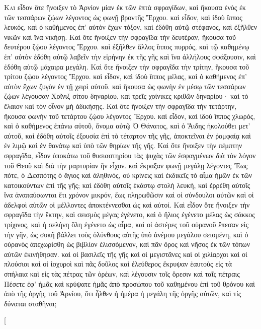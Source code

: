 \begin{pages}
    \begin{Rightside}
        \beginnumbering
		\renewcommand{\LettrineFontHook}{\PHtitl}
		\lettrine[lines=3]{Κ}{αὶ} εἶδον ὅτε ἤνοιξεν τὸ Ἀρνίον μίαν ἐκ τῶν ἑπτὰ σφραγίδων, καὶ ἤκουσα ἑνὸς ἐκ τῶν τεσσάρων ζῴων λέγοντος ὡς φωνῇ βροντῆς Ἔρχου. καὶ εἶδον, καὶ ἰδοὺ ἵππος λευκός, καὶ ὁ καθήμενος ἐπ’ αὐτὸν ἔχων τόξον, καὶ ἐδόθη αὐτῷ στέφανος, καὶ ἐξῆλθεν νικῶν καὶ ἵνα νικήσῃ.
		\pend
		\pstart
		Καὶ ὅτε ἤνοιξεν τὴν σφραγῖδα τὴν δευτέραν, ἤκουσα τοῦ δευτέρου ζῴου λέγοντος Ἔρχου. καὶ ἐξῆλθεν ἄλλος ἵππος πυρρός, καὶ τῷ καθημένῳ ἐπ’ αὐτὸν ἐδόθη αὐτῷ λαβεῖν τὴν εἰρήνην ἐκ τῆς γῆς καὶ ἵνα ἀλλήλους σφάξουσιν, καὶ ἐδόθη αὐτῷ μάχαιρα μεγάλη.
		\pend
		\pstart
		Καὶ ὅτε ἤνοιξεν τὴν σφραγῖδα τὴν τρίτην, ἤκουσα τοῦ τρίτου ζῴου λέγοντος Ἔρχου. καὶ εἶδον, καὶ ἰδοὺ ἵππος μέλας, καὶ ὁ καθήμενος ἐπ’ αὐτὸν ἔχων ζυγὸν ἐν τῇ χειρὶ αὐτοῦ. καὶ ἤκουσα ὡς φωνὴν ἐν μέσῳ τῶν τεσσάρων ζῴων λέγουσαν Χοῖνιξ σίτου δηναρίου, καὶ τρεῖς χοίνικες κριθῶν δηναρίου· καὶ τὸ ἔλαιον καὶ τὸν οἶνον μὴ ἀδικήσῃς. 
		\pend
		\pstart
		Καὶ ὅτε ἤνοιξεν τὴν σφραγῖδα τὴν τετάρτην, ἤκουσα φωνὴν τοῦ τετάρτου ζῴου λέγοντος Ἔρχου. καὶ εἶδον, καὶ ἰδοὺ ἵππος χλωρός, καὶ ὁ καθήμενος ἐπάνω αὐτοῦ, ὄνομα αὐτῷ Ὁ Θάνατος, καὶ ὁ Ἅιδης ἠκολούθει μετ’ αὐτοῦ, καὶ ἐδόθη αὐτοῖς ἐξουσία ἐπὶ τὸ τέταρτον τῆς γῆς, ἀποκτεῖναι ἐν ῥομφαίᾳ καὶ ἐν λιμῷ καὶ ἐν θανάτῳ καὶ ὑπὸ τῶν θηρίων τῆς γῆς.
		\pend
		\pstart
		Καὶ ὅτε ἤνοιξεν τὴν πέμπτην σφραγῖδα, εἶδον ὑποκάτω τοῦ θυσιαστηρίου τὰς ψυχὰς τῶν ἐσφαγμένων διὰ τὸν λόγον τοῦ Θεοῦ καὶ διὰ τὴν μαρτυρίαν ἣν εἶχον. καὶ ἔκραξαν φωνῇ μεγάλῃ λέγοντες Ἕως πότε, ὁ Δεσπότης ὁ ἅγιος καὶ ἀληθινός, οὐ κρίνεις καὶ ἐκδικεῖς τὸ αἷμα ἡμῶν ἐκ τῶν κατοικούντων ἐπὶ τῆς γῆς; καὶ ἐδόθη αὐτοῖς ἑκάστῳ στολὴ λευκή, καὶ ἐρρέθη αὐτοῖς ἵνα ἀναπαύσωνται ἔτι χρόνον μικρόν, ἕως πληρωθῶσιν καὶ οἱ σύνδουλοι αὐτῶν καὶ οἱ ἀδελφοὶ αὐτῶν οἱ μέλλοντες ἀποκτέννεσθαι ὡς καὶ αὐτοί.
		\pend
		\pstart
		Καὶ εἶδον ὅτε ἤνοιξεν τὴν σφραγῖδα τὴν ἕκτην, καὶ σεισμὸς μέγας ἐγένετο, καὶ ὁ ἥλιος ἐγένετο μέλας ὡς σάκκος τρίχινος, καὶ ἡ σελήνη ὅλη ἐγένετο ὡς αἷμα, καὶ οἱ ἀστέρες τοῦ οὐρανοῦ ἔπεσαν εἰς τὴν γῆν, ὡς συκῆ βάλλει τοὺς ὀλύνθους αὐτῆς ὑπὸ ἀνέμου μεγάλου σειομένη, καὶ ὁ οὐρανὸς ἀπεχωρίσθη ὡς βιβλίον ἑλισσόμενον, καὶ πᾶν ὄρος καὶ νῆσος ἐκ τῶν τόπων αὐτῶν ἐκινήθησαν. 
		\pend
		\pstart
		καὶ οἱ βασιλεῖς τῆς γῆς καὶ οἱ μεγιστᾶνες καὶ οἱ χιλίαρχοι καὶ οἱ πλούσιοι καὶ οἱ ἰσχυροὶ καὶ πᾶς δοῦλος καὶ ἐλεύθερος ἔκρυψαν ἑαυτοὺς εἰς τὰ σπήλαια καὶ εἰς τὰς πέτρας τῶν ὀρέων, καὶ λέγουσιν τοῖς ὄρεσιν καὶ ταῖς πέτραις Πέσετε ἐφ’ ἡμᾶς καὶ κρύψατε ἡμᾶς ἀπὸ προσώπου τοῦ καθημένου ἐπὶ τοῦ θρόνου καὶ ἀπὸ τῆς ὀργῆς τοῦ Ἀρνίου, ὅτι ἦλθεν ἡ ἡμέρα ἡ μεγάλη τῆς ὀργῆς αὐτῶν, καὶ τίς δύναται σταθῆναι;
		\pend
        \endnumbering
    \end{Rightside}
    \begin{Leftside}
        \beginnumbering
        \pstart[

\end{Leftside}
\end{pages}
